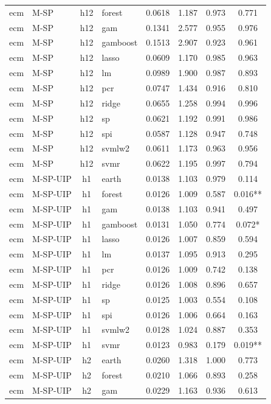 \begin{ThreePartTable}
\begin{longtable}[t]{llclcccc}
ecm & M-SP & h12 & forest & 0.0618 & 1.187 & 0.973 & 0.771\\
ecm & M-SP & h12 & gam & 0.1341 & 2.577 & 0.955 & 0.976\\
ecm & M-SP & h12 & gamboost & 0.1513 & 2.907 & 0.923 & 0.961\\
ecm & M-SP & h12 & lasso & 0.0609 & 1.170 & 0.985 & 0.963\\
ecm & M-SP & h12 & lm & 0.0989 & 1.900 & 0.987 & 0.893\\
ecm & M-SP & h12 & pcr & 0.0747 & 1.434 & 0.916 & 0.810\\
ecm & M-SP & h12 & ridge & 0.0655 & 1.258 & 0.994 & 0.996\\
ecm & M-SP & h12 & sp & 0.0621 & 1.192 & 0.991 & 0.986\\
ecm & M-SP & h12 & spi & 0.0587 & 1.128 & 0.947 & 0.748\\
ecm & M-SP & h12 & svmlw2 & 0.0611 & 1.173 & 0.963 & 0.956\\
ecm & M-SP & h12 & svmr & 0.0622 & 1.195 & 0.997 & 0.794\\
\addlinespace
ecm & M-SP-UIP & h1 & earth & 0.0138 & 1.103 & 0.979 & 0.114\\
ecm & M-SP-UIP & h1 & forest & 0.0126 & 1.009 & 0.587 & 0.016**\\
ecm & M-SP-UIP & h1 & gam & 0.0138 & 1.103 & 0.941 & 0.497\\
ecm & M-SP-UIP & h1 & gamboost & 0.0131 & 1.050 & 0.774 & 0.072*\\
ecm & M-SP-UIP & h1 & lasso & 0.0126 & 1.007 & 0.859 & 0.594\\
ecm & M-SP-UIP & h1 & lm & 0.0137 & 1.095 & 0.913 & 0.295\\
ecm & M-SP-UIP & h1 & pcr & 0.0126 & 1.009 & 0.742 & 0.138\\
ecm & M-SP-UIP & h1 & ridge & 0.0126 & 1.008 & 0.896 & 0.657\\
ecm & M-SP-UIP & h1 & sp & 0.0125 & 1.003 & 0.554 & 0.108\\
ecm & M-SP-UIP & h1 & spi & 0.0126 & 1.006 & 0.664 & 0.163\\
ecm & M-SP-UIP & h1 & svmlw2 & 0.0128 & 1.024 & 0.887 & 0.353\\
ecm & M-SP-UIP & h1 & svmr & 0.0123 & 0.983 & 0.179 & 0.019**\\
\addlinespace
ecm & M-SP-UIP & h2 & earth & 0.0260 & 1.318 & 1.000 & 0.773\\
ecm & M-SP-UIP & h2 & forest & 0.0210 & 1.066 & 0.893 & 0.258\\
ecm & M-SP-UIP & h2 & gam & 0.0229 & 1.163 & 0.936 & 0.613\\

\end{longtable}
\end{ThreePartTable}
